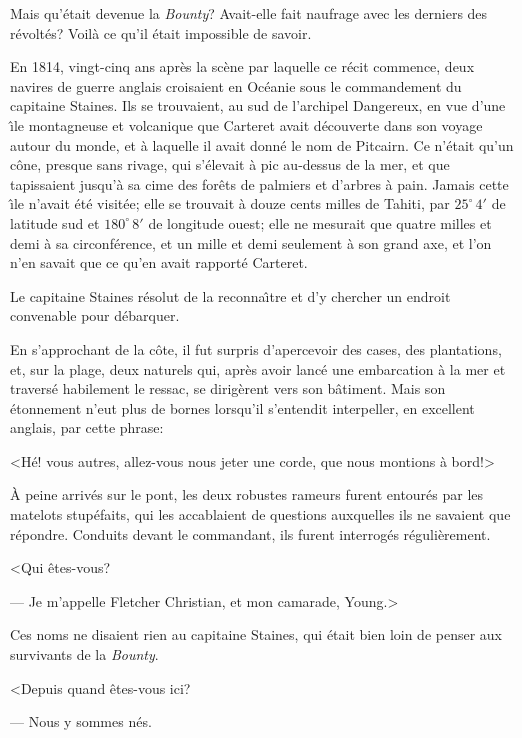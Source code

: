 Mais qu'\'etait devenue la {\sl Bounty\/}?
Avait-elle fait naufrage avec les derniers des
r\'evolt\'es? Voil\`a ce qu'il
\'etait impossible de savoir.

En 1814, vingt-cinq ans apr\`es la sc\`ene
par laquelle ce r\'ecit commence, deux navires de guerre
anglais croisaient en Oc\'eanie sous le commandement
du capitaine Staines.
Ils se trouvaient, au sud de l'archipel Dangereux,
en vue d'une {\^\i}le montagneuse et volcanique
que Carteret avait d\'ecouverte dans son voyage
autour du monde, et \`a laquelle il avait donn\'e
le nom de Pitcairn.
Ce n'\'etait qu'un c\^one, presque sans rivage,
qui s'\'elevait \`a pic au-dessus de la mer,
et que tapissaient jusqu'\`a sa cime des for\^ets
de palmiers et d'arbres \`a pain.
Jamais cette {\^\i}le n'avait \'et\'e visit\'ee;
elle se trouvait \`a douze cents milles de Tahiti, par
$25^\circ\,4'$ de latitude sud et $180^\circ\,8'$%
de longitude ouest; elle ne mesurait que quatre milles
et demi \`a sa circonf\'erence, et un mille et demi
seulement \`a son grand axe, et l'on n'en savait que
ce qu'en avait rapport\'e Carteret.

Le capitaine Staines r\'esolut de la reconna{\^\i}tre
et d'y chercher un endroit convenable pour d\'ebarquer.

En s'approchant de la c\^ote, il fut surpris d'apercevoir
des cases, des plantations, et, sur la plage, deux naturels
qui, apr\`es avoir lanc\'e une embarcation \`a
la mer et travers\'e habilement le ressac,
se dirig\`erent vers son b\^atiment.
Mais son \'etonnement n'eut plus de bornes lorsqu'il
s'entendit interpeller, en excellent anglais, par cette phrase:

<H\'e! vous autres, allez-vous nous jeter une corde,
que nous montions \`a bord!>

\`A peine arriv\'es sur le pont, les deux robustes
rameurs furent entour\'es par les matelots stup\'efaits,
qui les accablaient de questions auxquelles ils ne savaient
que r\'epondre. Conduits devant le commandant,
ils furent interrog\'es r\'eguli\`erement.

<Qui \^etes-vous?

--- Je m'appelle Fletcher Christian, et mon camarade, Young.>

Ces noms ne disaient rien au capitaine Staines, qui \'etait
bien loin de penser aux survivants de la {\sl Bounty}.

<Depuis quand \^etes-vous ici?

--- Nous y sommes n\'es.

